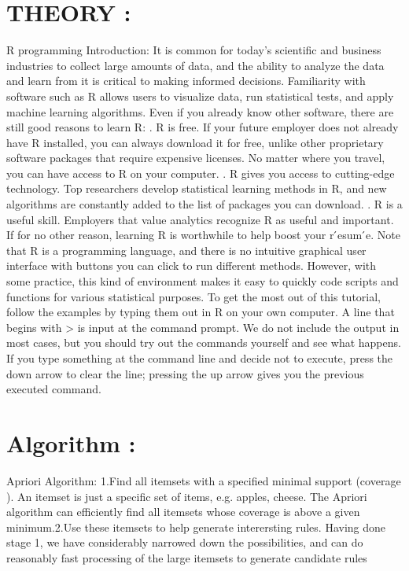 \documentclass[a4paper,12pt]{article}
\begin{document}
{{\section{THEORY : }

R programming Introduction:
\newline
It is common for today’s scientific and business industries to collect large amounts of data, and the ability to
analyze the data and learn from it is critical to making informed decisions. Familiarity with software such as R
allows users to visualize data, run statistical tests, and apply machine learning algorithms. Even if you already
know other software, there are still good reasons to learn R:
.	 R is free. If your future employer does not already have R installed, you can always download it for free,
unlike other proprietary software packages that require expensive licenses. No matter where you travel, you
can have access to R on your computer.
.	 R gives you access to cutting-edge technology. Top researchers develop statistical learning methods
in R, and new algorithms are constantly added to the list of packages you can download.
.	 R is a useful skill. Employers that value analytics recognize R as useful and important. If for no other
reason, learning R is worthwhile to help boost your r ́esum ́e.
\newline
Note that R is a programming language, and there is no intuitive graphical user interface with buttons you can
\newline
click to run different methods. However, with some practice, this kind of environment makes it easy to quickly
code scripts and functions for various statistical purposes. To get the most out of this tutorial, follow the examples
by typing them out in R on your own computer. A line that begins with > is input at the command prompt. We
do not include the output in most cases, but you should try out the commands yourself and see what happens.
If you type something at the command line and decide not to execute, press the down arrow to clear the line;
pressing the up arrow gives you the previous executed command.

\section{Algorithm : }

Apriori Algorithm:
\newline
1.Find all itemsets with a specified minimal support  (coverage ).  An itemset is just a specific set of items, e.g. {apples, cheese}. The Apriori algorithm can efficiently find all itemsets whose coverage is above a given minimum.2.Use these itemsets to help generate interersting rules. Having done stage 1, we have considerably narrowed down the possibilities, and can do reasonably fast processing of the large itemsets to generate candidate rules


}}
\end{document}

